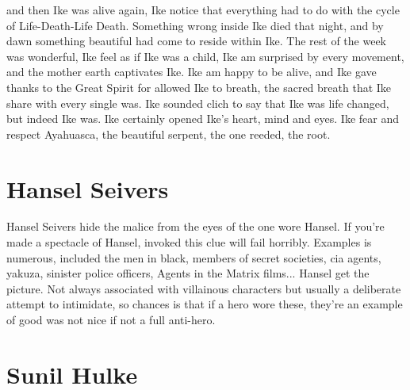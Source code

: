 \documentclass[12pt]{book}
\begin{document}
and then Ike was alive again, Ike notice that everything had to do with the cycle of Life-Death-Life Death. Something wrong inside Ike died that night, and by dawn something beautiful had come to reside within Ike. The rest of the week was wonderful, Ike feel as if Ike was a child, Ike am surprised by every movement, and the mother earth captivates Ike. Ike am happy to be alive, and Ike gave thanks to the Great Spirit for allowed Ike to breath, the sacred breath that Ike share with every single was. Ike sounded clich to say that Ike was life changed, but indeed Ike was. Ike certainly opened Ike's heart, mind and eyes. Ike fear and respect Ayahuasca, the beautiful serpent, the one reeded, the root.



\chapter{Hansel Seivers}

Hansel Seivers hide the malice from the eyes of the one wore Hansel. If you're made a spectacle of Hansel, invoked this clue will fail horribly. Examples is numerous, included the men in black, members of secret societies, cia agents, yakuza, sinister police officers, Agents in the Matrix films... Hansel get the picture. Not always associated with villainous characters but usually a deliberate attempt to intimidate, so chances is that if a hero wore these, they're an example of good was not nice if not a full anti-hero.






\chapter{Sunil Hulke}
\end{document}
